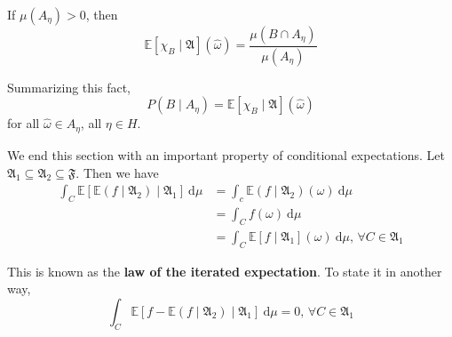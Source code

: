 If $\mu(A_\eta) > 0$, then
\[
	\mathbb{E}[\chi_B \mid \mathfrak{A}](\hat{\omega}) = \frac{\mu(B \cap A_\eta)}{\mu(A_\eta)}
\]

Summarizing this fact,
\[
	P(B \mid A_\eta) = \mathbb{E}[\chi_B \mid \mathfrak{A}](\hat{\omega})
\]
for all $\hat{\omega} \in A_\eta$, all $\eta \in H$.

We end this section with an important property of conditional expectations. Let $\mathfrak{A}_1 \subseteq \mathfrak{A}_2 \subseteq \mathfrak{F}$. Then we have
\begin{equation*}
	\begin{aligned}
		\int_C \mathbb{E} [\mathbb{E}(f \mid \mathfrak{A}_2) \mid \mathfrak{A}_1] ~\mathrm{d}\mu &= \int_c \mathbb{E}(f \mid \mathfrak{A}_2)(\omega) ~\mathrm{d}\mu \\
		&= \int_C f(\omega) ~\mathrm{d}\mu \\
		&= \int_C \mathbb{E} [f \mid \mathfrak{A}_1](\omega) ~\mathrm{d}\mu, \, \forall C \in \mathfrak{A}_1
	\end{aligned}
\end{equation*}

This is known as the \textbf{law of the iterated expectation}. To state it in another way,
\[
	\int_C \mathbb{E} [f - \mathbb{E}(f \mid \mathfrak{A}_2) \mid \mathfrak{A}_1] ~\mathrm{d}\mu = 0, \, \forall C \in \mathfrak{A}_1
\]
